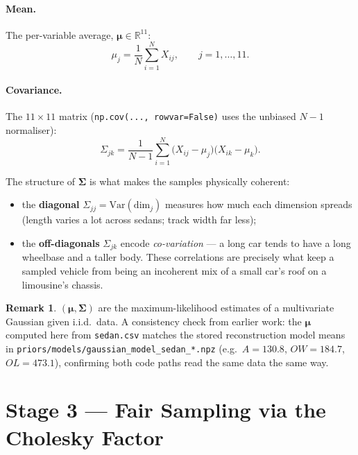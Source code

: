 \documentclass[11pt]{article}
\newcommand{\OL}{\mathit{OL}}
\newcommand{\OW}{\mathit{OW}}
\newcommand{\bmu}{\boldsymbol{\mu}}
\newcommand{\bSigma}{\boldsymbol{\Sigma}}
\theoremstyle{definition}
\newtheorem{remark}{Remark}
\begin{document}
\paragraph{Mean.} The per-variable average, $\bmu\in\mathbb{R}^{11}$:
\begin{equation}
\mu_j=\frac{1}{N}\sum_{i=1}^{N}X_{ij}, \qquad j=1,\dots,11.
\end{equation}

\paragraph{Covariance.} The $11\times11$ matrix (\texttt{np.cov(..., rowvar=False)} uses the unbiased $N{-}1$ normaliser):
\begin{equation}
\Sigma_{jk}=\frac{1}{N-1}\sum_{i=1}^{N}\big(X_{ij}-\mu_j\big)\big(X_{ik}-\mu_k\big).
\end{equation}

\noindent The structure of $\bSigma$ is what makes the samples physically coherent:
\begin{itemize}[leftmargin=2em]
  \item the \textbf{diagonal} $\Sigma_{jj}=\mathrm{Var}(\text{dim}_j)$ measures how much each dimension spreads (length varies a lot across sedans; track width far less);
  \item the \textbf{off-diagonals} $\Sigma_{jk}$ encode \emph{co-variation} --- a long car tends to have a long wheelbase and a taller body. These correlations are precisely what keep a sampled vehicle from being an incoherent mix of a small car's roof on a limousine's chassis.
\end{itemize}

\begin{remark}
$(\bmu,\bSigma)$ are the maximum-likelihood estimates of a multivariate Gaussian given i.i.d.\ data. A consistency check from earlier work: the $\bmu$ computed here from \texttt{sedan.csv} matches the stored reconstruction model means in \texttt{priors/models/gaussian\_model\_sedan\_*.npz} (e.g.\ $A{=}130.8$, $\OW{=}184.7$, $\OL{=}473.1$), confirming both code paths read the same data the same way.
\end{remark}

\section{Stage 3 --- Fair Sampling via the Cholesky Factor}
\end{document}
